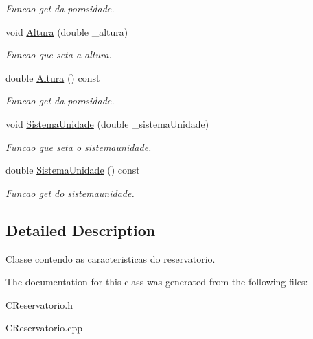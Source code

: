 \begin{DoxyCompactItemize}
\begin{DoxyCompactList}\small\item\em Funcao get da porosidade. \end{DoxyCompactList}\item 
\hypertarget{classCReservatorio_a446c0a9088655695a7180f0a6444d5a7}{void \hyperlink{classCReservatorio_a446c0a9088655695a7180f0a6444d5a7}{Altura} (double \-\_\-altura)}\label{classCReservatorio_a446c0a9088655695a7180f0a6444d5a7}

\begin{DoxyCompactList}\small\item\em Funcao que seta a altura. \end{DoxyCompactList}\item 
\hypertarget{classCReservatorio_a99c3dba3632785a5f392776c4f5a35cb}{double \hyperlink{classCReservatorio_a99c3dba3632785a5f392776c4f5a35cb}{Altura} () const }\label{classCReservatorio_a99c3dba3632785a5f392776c4f5a35cb}

\begin{DoxyCompactList}\small\item\em Funcao get da porosidade. \end{DoxyCompactList}\item 
\hypertarget{classCReservatorio_a2444dd4eccc764e132d2451651f7a658}{void \hyperlink{classCReservatorio_a2444dd4eccc764e132d2451651f7a658}{Sistema\-Unidade} (double \-\_\-sistema\-Unidade)}\label{classCReservatorio_a2444dd4eccc764e132d2451651f7a658}

\begin{DoxyCompactList}\small\item\em Funcao que seta o sistemaunidade. \end{DoxyCompactList}\item 
\hypertarget{classCReservatorio_a9d45fb13dd53281fc2de9ea5b4a3f44b}{double \hyperlink{classCReservatorio_a9d45fb13dd53281fc2de9ea5b4a3f44b}{Sistema\-Unidade} () const }\label{classCReservatorio_a9d45fb13dd53281fc2de9ea5b4a3f44b}

\begin{DoxyCompactList}\small\item\em Funcao get do sistemaunidade. \end{DoxyCompactList}\end{DoxyCompactItemize}


\subsection{Detailed Description}
Classe contendo as caracteristicas do reservatorio. 

The documentation for this class was generated from the following files\-:\begin{DoxyCompactItemize}
\item 
C\-Reservatorio.\-h\item 
C\-Reservatorio.\-cpp\end{DoxyCompactItemize}

